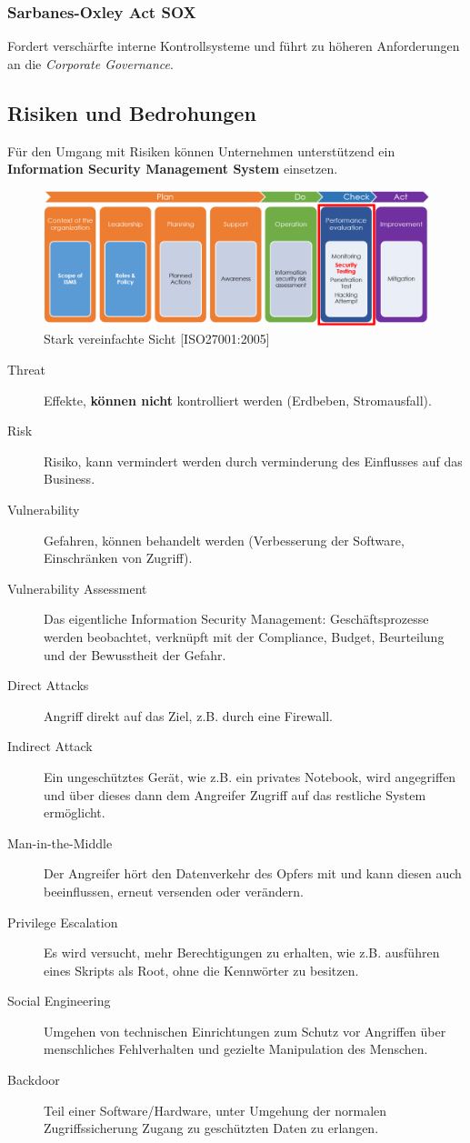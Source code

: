 \subsubsection{Sarbanes-Oxley Act SOX}
Fordert verschärfte interne Kontrollsysteme und führt zu höheren Anforderungen an die \textit{Corporate Governance}.

\subsection{Risiken und Bedrohungen}

Für den Umgang mit Risiken können Unternehmen unterstützend ein \textbf{Information Security Management System} einsetzen.

\begin{figure}[H]
	\includegraphics[width=\textwidth]{./img/ISO27001_overview}
	\caption{Stark vereinfachte Sicht [ISO27001:2005]}
\end{figure}

\begin{description}
	\item[Threat] Effekte, \textbf{können nicht} kontrolliert werden (Erdbeben, Stromausfall).
	\item[Risk] Risiko, kann vermindert werden durch verminderung des Einflusses auf das Business.
	\item[Vulnerability] Gefahren, können behandelt werden (Verbesserung der Software, Einschränken von Zugriff).
	\item[Vulnerability Assessment] Das eigentliche Information Security Management: Geschäftsprozesse werden beobachtet, verknüpft mit der Compliance, Budget, Beurteilung und der Bewusstheit der Gefahr.
	\item[Direct Attacks] Angriff direkt auf das Ziel, z.B. durch eine Firewall.
	\item[Indirect Attack] Ein ungeschütztes Gerät, wie z.B. ein privates Notebook, wird angegriffen und über dieses dann dem Angreifer Zugriff auf das restliche System ermöglicht.
	\item[Man-in-the-Middle] Der Angreifer hört den Datenverkehr des Opfers mit und kann diesen auch beeinflussen, erneut versenden oder verändern.
	\item[Privilege Escalation] Es wird versucht, mehr Berechtigungen zu erhalten, wie z.B. ausführen eines Skripts als Root, ohne die Kennwörter zu besitzen.
	\item[Social Engineering] Umgehen von technischen Einrichtungen zum Schutz vor Angriffen über menschliches Fehlverhalten und gezielte Manipulation des Menschen.
	\item[Backdoor] Teil einer Software/Hardware, unter Umgehung der normalen Zugriffssicherung Zugang zu geschützten Daten zu erlangen.
\end{description}